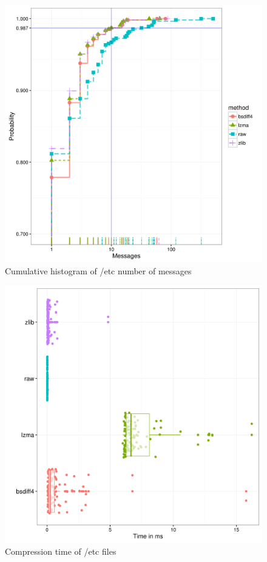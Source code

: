 \documentclass{sig-alternate}
\begin{document}
\begin{figure}[htp]
\centering
\includegraphics[width=\columnwidth]{../eval/plots/etc_messages.png}
\caption{Cumulative histogram of /etc number of messages}
\label{fig:etc-messages}
\end{figure}

\begin{figure}[htp]
\centering
\includegraphics[width=\columnwidth]{../eval/plots/etc_time.png}
\caption{Compression time of /etc files}
\label{fig:etc-time}
\end{figure}
\end{document}
